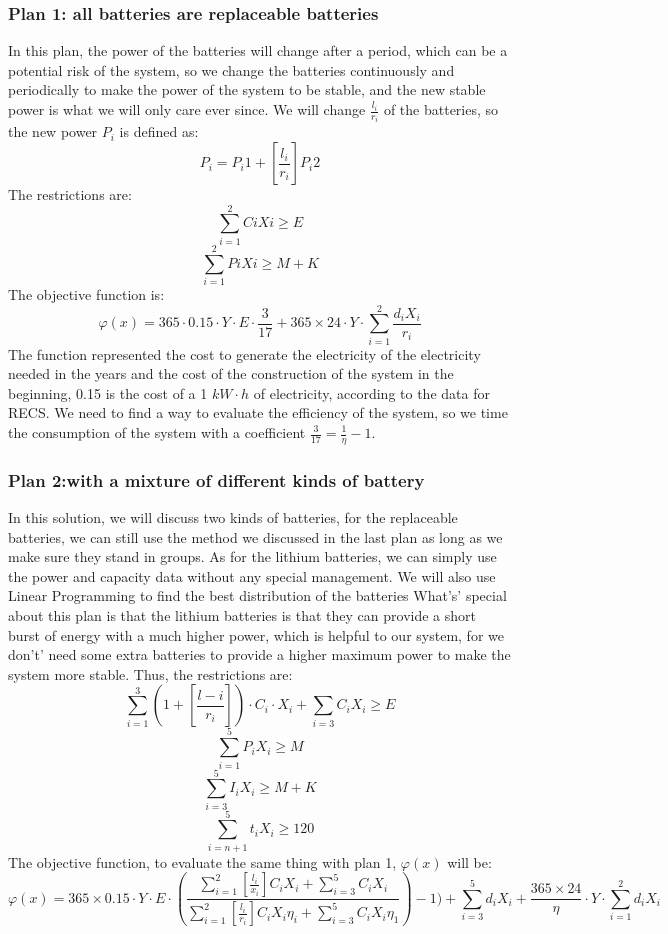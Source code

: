 \documentclass[12pt]{article}
\begin{document}
\subsubsection{Plan 1: all batteries are replaceable batteries}
In this plan, the power of the batteries will change after a period, which can be a potential risk of the system, so we change the batteries continuously and periodically to make
the power of the system to be stable, and the new stable power is what we will only care ever since. We will change $\frac{l_i}{r_i}$ of the batteries, so the new power $P_i$ is  defined
as:$$P_i=P_i1+[\frac{l_i}{r_i}]P_i2$$
The restrictions are:
$$\sum_{i=1}^2CiXi\geq E$$
$$\sum_{i=1}^2PiXi\geq M+K$$
The objective function is:
$$\varphi (x)=365 \cdot 0.15 \cdot Y \cdot E \cdot \frac{3}{17} +365\times 24\cdot Y \cdot \sum_{i=1} ^2\frac{d_iX_i}{r_i}$$
The function represented the cost to generate the electricity of the electricity needed in the years and the cost of the construction of the system in the beginning, 0.15 is the cost of a 1 $kW\cdot h$ of electricity,
according to the data for RECS. We need to find a way to evaluate the efficiency of the system, so we time the consumption of the system with a coefficient $\frac{3}{17}=\frac{1}{\eta }-1$.
\subsubsection{Plan 2:with a mixture of different kinds of battery}
In this solution, we will discuss two kinds of batteries, for the replaceable batteries, we can still use the method we discussed in the last plan as long as we make sure they stand
in groups. As for the lithium batteries, we can simply use the power and capacity data without any special management. We will also use Linear Programming to find the best distribution of
the batteries
What's' special about this plan is that the lithium batteries is that they can provide a short burst of energy with a much higher power, which is helpful to our system, for we don't' need some extra batteries
to provide a higher maximum power to make the system more stable.
Thus, the restrictions are:
$$\sum_{i=1}^3(1+[\frac{l-i}{r_i}]) \cdot C_i \cdot X_i + \sum_{i=3}C_iX_i\geq E$$
$$\sum_{i=1}^5P_iX_i\geq M$$
$$\sum_{i=3}^5I_iX_i\geq M+K$$
$$\sum_{i=n+1}^5 t_iX_i\geq 120$$
The objective function, to evaluate the same thing with plan 1, $\varphi (x)$ will be:
$$\varphi (x) = 365 \times 0.15 \cdot Y \cdot E \cdot (\frac{\sum^2_{i=1}[\frac{l_i}{x_i}]C_iX_i+\sum_{i=3}^5C_iX_i}{\sum^2_{i=1}[\frac{l_i}{r_i}]C_iX_i\eta _i+\sum_{i=3}^5C_iX_i\eta _1})-1)
    + \sum_{i=3} ^5d_iX_i+\frac{365 \times 24}{\eta } \cdot Y \cdot \sum_{i=1} ^2d_iX_i $$
\end{document}
